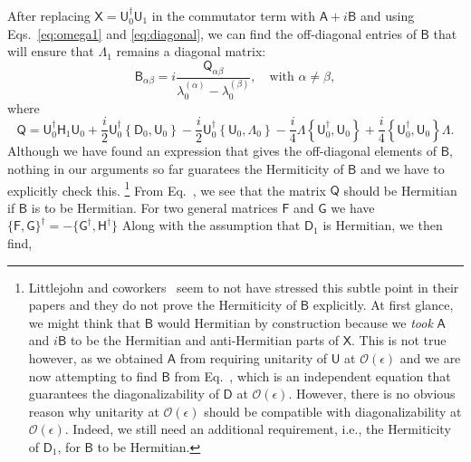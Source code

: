 After replacing $\mathsf{X} = \mathsf{U}_{0}^{\dagger}\mathsf{U}_{1}$ in the commutator term with $\mathsf{A} + i\mathsf{B}$ and using Eqs.~\eqref{eq:omega1} and \eqref{eq:diagonal}, we can find the off-diagonal entries of $\mathsf{B}$ that will ensure that $\Lambda_{1}$ remains a diagonal matrix:
%
\begin{equation}
  \mathsf{B}_{\alpha\beta} = i\frac{\mathsf{Q}_{\alpha\beta}}{\lambda_{0}^{(\alpha)} - \lambda_{0}^{(\beta)}},
  \quad \text{with }\alpha \neq \beta,
\end{equation}
%
where
%
\begin{equation}
  \mathsf{Q} = \mathsf{U}_{0}^{\dagger}\mathsf{H}_{1}\mathsf{U}_{0} + \frac{i}{2}\mathsf{U}_{0}^{\dagger}\left\{\mathsf{D}_{0},\mathsf{U}_{0}\right\} - \frac{i}{2}\mathsf{U}_{0}^{\dagger}\left\{\mathsf{U}_{0},\Lambda_{0}\right\}
  -\frac{i}{4}\Lambda\left\{\mathsf{U}_{0}^{\dagger}, \mathsf{U}_{0}\right\} +
  \frac{i}{4}\left\{\mathsf{U}_{0}^{\dagger}, \mathsf{U}_{0}\right\}\Lambda.
\end{equation}
%
Although we have found an expression that gives the off-diagonal elements of $\mathsf{B}$, nothing in our arguments so far guaratees the Hermiticity of $\mathsf{B}$ and we have to explicitly check this.%
\footnote{Littlejohn and coworkers~\cite{littlejohn1991,weigert1993} seem to not have stressed this subtle point in their papers and they do not prove the Hermiticity of $\mathsf{B}$ explicitly.
  At first glance, we might think that $\mathsf{B}$ would Hermitian by construction because we \emph{took} $\mathsf{\mathsf{A}}$ and $i\mathsf{B}$ to be the Hermitian and anti-Hermitian parts of $\mathsf{X}$.
  This is not true however, as we obtained $\mathsf{A}$ from requiring unitarity of $\mathsf{U}$ at $\mathcal{O}(\epsilon)$ and we are now attempting to find $\mathsf{B}$ from Eq.~\fixme, which is an independent equation that guarantees the diagonalizability of $\mathsf{D}$ at $\mathcal{O}(\epsilon)$.
  However, there is no obvious reason why unitarity at $\mathcal{O}(\epsilon)$ should be compatible with diagonalizability at $\mathcal{O}(\epsilon)$.
  Indeed, we still need an additional requirement, i.e., the Hermiticity of $\mathsf{D}_{1}$, for $\mathsf{B}$ to be Hermitian.
}
From Eq.~\fixme, we see that the matrix $\mathsf{Q}$ should be Hermitian if $\mathsf{B}$ is to be Hermitian.
For two general matrices $\mathsf{F}$ and $\mathsf{G}$ we have $\{\mathsf{F},\mathsf{G}\}^{\dagger} = -\{\mathsf{G}^{\dagger},\mathsf{H}^{\dagger}\}$
Along with the assumption that $\mathsf{D}_{1}$ is Hermitian, we then find,
%

